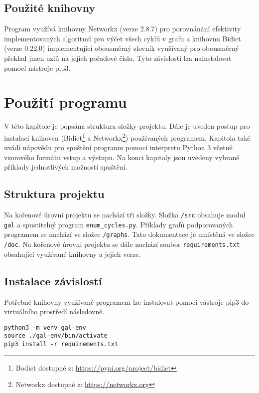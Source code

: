     \newpage

    \section{Použité knihovny}
        Program využívá knihovny Networkx (verze 2.8.7) pro porovnánání efektivity implementovaných algoritmů pro výčet všech cyklů v grafu a knihovnu Bidict (verze 0.22.0) implementující obousměrný slovník využívaný pro obousměrný překlad jmen uzlů na jejích pořadové čísla. Tyto závislosti lza nainstalovat pomocí nástroje pip3.



\chapter{Použití programu}
    \label{chapter:Help}
    V této kapitole je popsána struktura složky projektu. Dále je uveden postup pro instalaci knihoven (Bidict\footnote{Bodict dostupné z: \url{https://pypi.org/project/bidict}} a Networkx\footnote{Networkx dostupné z: \url{https://networkx.org}}) používaných programem. Kapitola také uvádí nápovědu pro spuštění programu pomocí interpretu Python 3 včetně vzorového formátu vstup a výstupu. Na konci kapitoly jsou uvedeny vybrané příklady jednotlivých možností spuštění.

    \section{Struktura projektu}
        Na kořenové úrovni projektu se nachází tři složky. Složka \texttt{/src} obsahuje modul \texttt{gal} a spustitelný program \texttt{enum\_cycles.py}. Příklady grafů podporovaných programem se nachází ve složce \texttt{/graphs}. Tato dokumentace je umístěná ve složce \texttt{/doc}. Na kořenové úrovni projektu se dále nachází soubor \texttt{requirements.txt} obsahující využívané knihovny a jejich verze.

    \section{Instalace závislostí}
        Potřebné knihovny využívané programem lze instalovat pomocí vástroje pip3 do virtuálního prostředí následovně.

        \vspace*{1em}
        \noindent\texttt{python3 -m venv gal-env\\
            source ./gal-env/bin/activate\\
            pip3 install -r requirements.txt
        }

